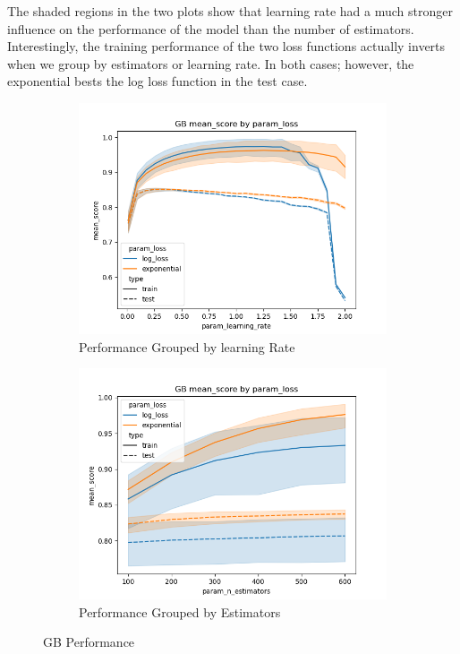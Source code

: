 \documentclass[12pt]{article}
\begin{document}
The shaded regions in the two plots show that learning rate had a much stronger influence on the performance of the model 
than the number of estimators. Interestingly, the training performance of the two loss functions actually inverts when 
we group by estimators or learning rate. In both cases; however, the exponential bests the log loss function in the 
test case.
\begin{figure}
  \begin{subfigure}{.5\textwidth}
  \includegraphics[width=.95\textwidth]{../results/gb/param_loss_mean_score_param_learning_rate.png}
    \caption{Performance Grouped by learning Rate}
    \end{subfigure}%
  \begin{subfigure}{.5\textwidth}
    \includegraphics[width=.95\textwidth]{../results/gb/param_loss_mean_score_param_n_estimators.png}
    \caption{Performance Grouped by Estimators}
  \end{subfigure}
  \caption{GB Performance}
  \label{figure1}
\end{figure}
\end{document}
